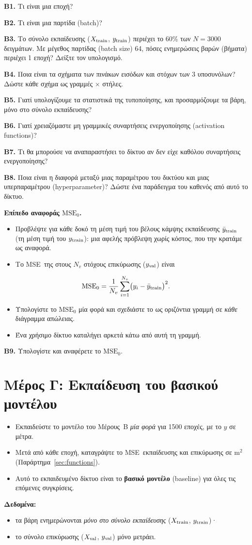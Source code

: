 \documentclass[11pt]{article}
\newcommand{\question}[2]{\par\noindent\textbf{#1.} #2\par}
\newcommand{\datause}[1]{\par\smallskip\needspace{4\baselineskip}\noindent\textbf{Δεδομένα:}\nopagebreak\begin{itemize}#1\end{itemize}}
\newcommand{\unit}[1]{\textlatin{#1}}
\newcommand{\MSE}{\textlatin{MSE}}
\begin{document}
\question{Β1}{Τι είναι μια εποχή?}
\question{Β2}{Τι είναι μια παρτίδα (\textlatin{batch})?}
\question{Β3}{Το σύνολο εκπαίδευσης ($X_{\rm train}$, $y_{\rm train}$) περιέχει το 60\% των $N=3000$ δειγμάτων. Με μέγεθος παρτίδας (\textlatin{batch size}) 64, πόσες ενημερώσεις βαρών (βήματα) περιέχει 1 εποχή? Δείξτε τον υπολογισμό.}
\question{Β4}{Ποια είναι τα σχήματα των πινάκων εισόδων και στόχων των 3 υποσυνόλων? Δώστε κάθε σχήμα ως γραμμές $\times$ στήλες.}
\question{Β5}{Γιατί υπολογίζουμε τα στατιστικά της τυποποίησης, και προσαρμόζουμε τα βάρη, μόνο στο σύνολο εκπαίδευσης?}
\question{Β6}{Γιατί χρειαζόμαστε μη γραμμικές συναρτήσεις ενεργοποίησης (\textlatin{activation functions})?}
\question{Β7}{Τι θα μπορούσε να αναπαραστήσει το δίκτυο αν δεν είχε καθόλου συναρτήσεις ενεργοποίησης?}
\question{Β8}{Ποια είναι η διαφορά μεταξύ μιας παραμέτρου του δικτύου και μιας υπερπαραμέτρου (\textlatin{hyperparameter})? Δώστε ένα παράδειγμα του καθενός από αυτό το δίκτυο.}

\noindent\textbf{Επίπεδο αναφοράς $\mathrm{MSE}_0$.}
\begin{itemize}
  \item Προβλέψτε για κάθε δοκό τη μέση τιμή του βέλους κάμψης εκπαίδευσης $\bar y_{\rm train}$ (τη μέση τιμή του $y_{\rm train}$): μια αφελής πρόβλεψη χωρίς κόστος, που την κρατάμε ως αναφορά.
  \item Το \MSE\ της στους $N_v$ στόχους επικύρωσης ($y_{\rm val}$) είναι
\end{itemize}
\[
  \mathrm{MSE}_0=\frac{1}{N_v}\sum_{i=1}^{N_v}\bigl(y_i-\bar y_{\rm train}\bigr)^2 .
\]
\begin{itemize}
  \item Υπολογίστε το $\mathrm{MSE}_0$ μία φορά και σχεδιάστε το ως οριζόντια γραμμή σε \emph{κάθε} διάγραμμα απώλειας.
  \item Ένα χρήσιμο δίκτυο καταλήγει αρκετά κάτω από αυτή τη γραμμή.
\end{itemize}

\question{Β9}{Υπολογίστε και αναφέρετε το $\mathrm{MSE}_0$.}

\section*{Μέρος Γ: Εκπαίδευση του βασικού μοντέλου}
\begin{itemize}
  \item \aitrap Εκπαιδεύστε το μοντέλο του Μέρους~Β \emph{μία φορά} για 1500 εποχές, με το $y$ σε μέτρα.
  \item Μετά από κάθε εποχή, καταγράψτε το \MSE\ εκπαίδευσης και επικύρωσης σε \unit{m}$^2$ (Παράρτημα~\ref{sec:functions}).
  \item Αυτό το εκπαιδευμένο δίκτυο είναι το \textbf{βασικό μοντέλο} (\textlatin{baseline}) για όλες τις επόμενες συγκρίσεις.
\end{itemize}
\datause{
  \item τα βάρη ενημερώνονται \emph{μόνο στο σύνολο εκπαίδευσης} ($X_{\rm train}$, $y_{\rm train}$)·
  \item το σύνολο επικύρωσης ($X_{\rm val}$, $y_{\rm val}$) μόνο μετράει.}
\end{document}
